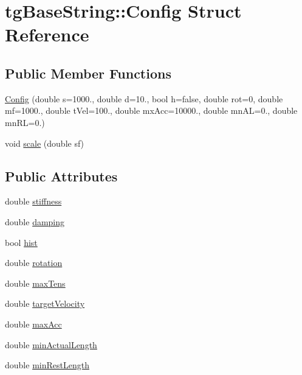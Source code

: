 \hypertarget{structtg_base_string_1_1_config}{\section{tg\-Base\-String\-:\-:Config Struct Reference}
\label{structtg_base_string_1_1_config}
}
\subsection*{Public Member Functions}
\begin{DoxyCompactItemize}
\item 
\hyperlink{structtg_base_string_1_1_config_ac40c60ffadf6ea368013580a4cc907bc}{Config} (double s=1000., double d=10., bool h=false, double rot=0, double mf=1000., double t\-Vel=100., double mx\-Acc=10000., double mn\-A\-L=0., double mn\-R\-L=0.)
\item 
void \hyperlink{structtg_base_string_1_1_config_ac5b9fa58a4b3bc751a5e09098e7008ff}{scale} (double sf)
\end{DoxyCompactItemize}
\subsection*{Public Attributes}
\begin{DoxyCompactItemize}
\item 
double \hyperlink{structtg_base_string_1_1_config_a7f0c0e1ddae4ca1594d50bcc9559250e}{stiffness}
\item 
double \hyperlink{structtg_base_string_1_1_config_af4b6fda56bf8480c727b633fad4d27eb}{damping}
\item 
bool \hyperlink{structtg_base_string_1_1_config_ad66c89fe30ffaa19f1ac15de7d5b269b}{hist}
\item 
double \hyperlink{structtg_base_string_1_1_config_adcbba0b56f674d0c38b1fc98e99e3d64}{rotation}
\item 
double \hyperlink{structtg_base_string_1_1_config_a0db6cb3d545d501cd40f2d24545e91e8}{max\-Tens}
\item 
double \hyperlink{structtg_base_string_1_1_config_aec33f58f8ed31fcc41efef395eeca779}{target\-Velocity}
\item 
double \hyperlink{structtg_base_string_1_1_config_aefa59fa6c9a4ea484249ab757632f6cc}{max\-Acc}
\item 
double \hyperlink{structtg_base_string_1_1_config_afda46419afa830031e2a9935d73a75dc}{min\-Actual\-Length}
\item 
double \hyperlink{structtg_base_string_1_1_config_a487963813055e418a148e65d2a3a0d9e}{min\-Rest\-Length}
\end{DoxyCompactItemize}


